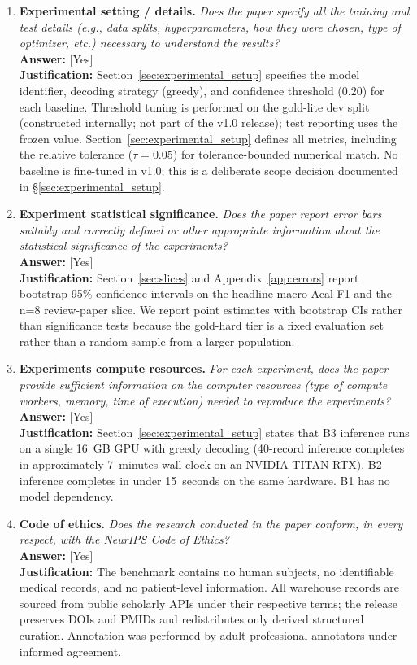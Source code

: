 \begin{enumerate}
\item \textbf{Experimental setting / details.}
\emph{Does the paper specify all the training and test details
(e.g., data splits, hyperparameters, how they were chosen, type of
optimizer, etc.) necessary to understand the results?}\\
\textbf{Answer:} [Yes] \\
\textbf{Justification:} Section~\ref{sec:experimental_setup} specifies the model
identifier, decoding strategy (greedy), and confidence threshold
($0.20$) for each baseline. Threshold tuning is performed on the
gold-lite dev split (constructed internally; not part of the v1.0
release); test reporting uses the frozen value.
Section~\ref{sec:experimental_setup} defines all metrics, including the
relative tolerance ($\tau=0.05$) for tolerance-bounded numerical
match. No baseline is fine-tuned in v1.0; this is a deliberate scope
decision documented in \S\ref{sec:experimental_setup}.

\item \textbf{Experiment statistical significance.}
\emph{Does the paper report error bars suitably and correctly defined
or other appropriate information about the statistical significance
of the experiments?}\\
\textbf{Answer:} [Yes] \\
\textbf{Justification:} Section~\ref{sec:slices} and
Appendix~\ref{app:errors} report bootstrap 95\% confidence intervals
on the headline macro Acal-F1 and the n=8 review-paper slice. We
report point estimates with bootstrap CIs rather than significance
tests because the gold-hard tier is a fixed evaluation set rather
than a random sample from a larger population.

\item \textbf{Experiments compute resources.}
\emph{For each experiment, does the paper provide sufficient
information on the computer resources (type of compute workers,
memory, time of execution) needed to reproduce the experiments?}\\
\textbf{Answer:} [Yes] \\
\textbf{Justification:} Section~\ref{sec:experimental_setup} states that B3
inference runs on a single 16~GB GPU with greedy decoding (40-record
inference completes in approximately 7~minutes wall-clock on an
NVIDIA TITAN RTX). B2 inference completes in under 15~seconds on the
same hardware. B1 has no model dependency.

\item \textbf{Code of ethics.}
\emph{Does the research conducted in the paper conform, in every
respect, with the NeurIPS Code of Ethics?}\\
\textbf{Answer:} [Yes] \\
\textbf{Justification:} The benchmark contains no human subjects, no
identifiable medical records, and no patient-level information. All
warehouse records are sourced from public scholarly APIs under their
respective terms; the release preserves DOIs and PMIDs and
redistributes only derived structured curation. Annotation was
performed by adult professional annotators under informed agreement.


\end{enumerate}
